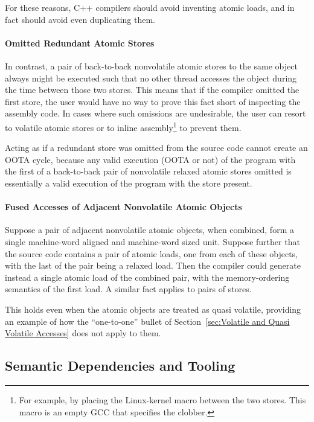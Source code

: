 \documentclass[10]{article}
\begin{document}
For these reasons, C++ compilers should avoid inventing atomic
loads, and in fact should avoid even duplicating them.

\paragraph{Omitted Redundant Atomic Stores}
In contrast, a pair of back-to-back nonvolatile atomic stores to the
same object
always might be executed such that no other thread accesses the object
during the time between those two stores.
This means that if the compiler omitted the first store,
the user would have no way to prove this fact short of
inspecting the assembly code.
In cases where such omissions are undesirable, the user can resort to
volatile atomic stores or to inline assembly\footnote{
	For example, by placing the Linux-kernel  macro
	between the two stores.
	This macro is an empty GCC  that specifies the 
	clobber.}
to prevent them.

Acting as if a redundant store was omitted from the source
code cannot create an OOTA cycle, because any valid execution (OOTA or not)
of the program with the first of a back-to-back pair of nonvolatile
relaxed atomic stores omitted is essentially a valid execution of the
program with the store present.

\paragraph{Fused Accesses of Adjacent Nonvolatile Atomic Objects}
Suppose a pair of adjacent nonvolatile atomic objects, when combined,
form a single machine-word aligned and machine-word sized unit.
Suppose further that the source code contains a pair of atomic
loads, one from each of these objects, with the last of the pair
being a relaxed load.
Then the compiler could generate instead
a single atomic load of the combined pair,
with the memory-ordering semantics of the first load.
A similar fact applies to pairs of stores.

This holds even when the atomic objects are treated as quasi volatile,
providing an example of how the ``one-to-one'' bullet of
Section~\ref{sec:Volatile and Quasi Volatile Accesses} does not apply
to them.

\subsection{Semantic Dependencies and Tooling}
\label{sec:Semantic Dependencies and Tooling}
\end{document}
